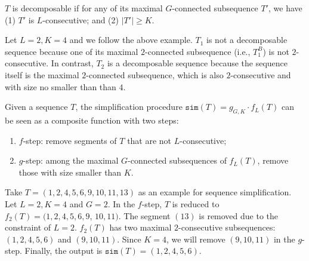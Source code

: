 \begin{definition}
$T$ is decomposable if for any of its maximal $G$-connected subsequence $T'$, we have (1) $T'$ is $L$-consecutive; and (2) $|T'|\geq K$.
\end{definition}

\begin{example}
Let $L = 2, K = 4$ and we follow the above example. $T_1$ is not a decomposable sequence
because one of its maximal $2$-connected subsequence (i.e., $T_1^B$) is not $2$-consecutive.
In contrast, $T_2$ is a decomposable sequence because the sequence itself is the maximal $2$-connected subsequence, which is also $2$-consecutive and with size no smaller than than $4$.
\end{example}

\begin{definition}
Given a sequence $T$, the simplification procedure $\mathtt{sim}(T) =  g_{G,K} \cdot f_L(T) $ can be seen as a composite function with two steps: 
\begin{enumerate}
\item $f$-step: remove segments of $T$ that are not $L$-consecutive;
\item $g$-step: among the maximal $G$-connected subsequences of $f_L(T)$, remove those with size smaller than $K$.
\end{enumerate}
\end{definition}


\begin{example}
Take $T=(1,2,4,5,6,9,10,11,13)$ as an example for sequence simplification. 
Let $L = 2, K = 4$ and $G = 2$. In the $f$-step, $T$ is reduced to $f_2(T)=(1,2,4,5,6,9$, $10,11)$. 
The segment $(13)$ is removed due to the constraint of $L=2$. 
$f_2(T)$ has two maximal $2$-consecutive subsequences: $(1,2,4,5,6)$ and $(9,10,11)$. 
Since $K=4$, we will remove $(9,10,11)$ in the $g$-step. Finally, the output is $\mathtt{sim}(T)=(1,2,4,5,6)$.
\end{example}

